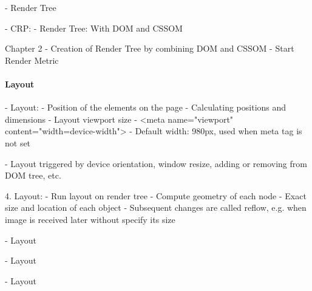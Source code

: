 - Render Tree




- CRP:
- Render Tree: With DOM and CSSOM



Chapter 2
- Creation of Render Tree by combining DOM and CSSOM
- Start Render Metric





\paragraph{Layout}





- Layout:
	- Position of the elements on the page
	- Calculating positions and dimensions
	- Layout viewport size
	- <meta name="viewport" content="width=device-width">
	- Default width: 980px, used when meta tag is not set

	- Layout triggered by device orientation, window resize, adding or removing from DOM tree, etc.
	

4. Layout:
- Run layout on render tree
- Compute geometry of each node
- Exact size and location of each object
- Subsequent changes are called reflow, e.g. when image is received later without specify its size


- Layout


- Layout


- Layout








